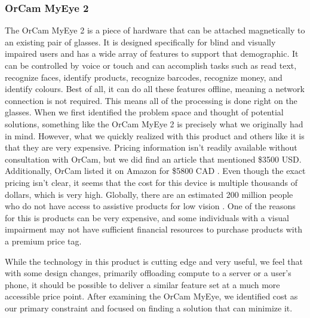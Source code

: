 \documentclass[a4paper,11pt]{article}
\begin{document}
\subsubsection{OrCam MyEye 2}
The OrCam MyEye 2 \cite{orcam} is a piece of hardware that can be attached magnetically to an existing pair of glasses. It is designed specifically for blind and visually impaired users and has a wide array of features to support that demographic. It can be controlled by voice or touch and can accomplish tasks such as read text, recognize faces, identify products, recognize barcodes, recognize money, and identify colours. Best of all, it can do all these features offline, meaning a network connection is not required. This means all of the processing is done right on the glasses. When we first identified the problem space and thought of potential solutions, something like the OrCam MyEye 2 is precisely what we originally had in mind. However, what we quickly realized with this product and others like it is that they are very expensive. Pricing information isn't readily available without consultation with OrCam, but we did find an article \cite{orcam-price} that mentioned \$3500 USD. Additionally, OrCam listed it on Amazon for \$5800 CAD \cite{orcam-amazon}. Even though the exact pricing isn't clear, it seems that the cost for this device is multiple thousands of dollars, which is very high. Globally, there are an estimated 200 million people who do not have access to assistive products for low vision \cite{WHO-assistive}. One of the reasons for this is products can be very expensive, and some individuals with a visual impairment may not have sufficient financial resources to purchase products with a premium price tag.

While the technology in this product is cutting edge and very useful, we feel that with some design changes, primarily offloading compute to a server or a user's phone, it should be possible to deliver a similar feature set at a much more accessible price point. After examining the OrCam MyEye, we identified cost as our primary constraint and focused on finding a solution that can minimize it.
\end{document}
